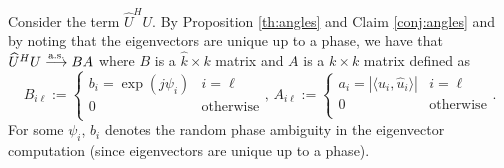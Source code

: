 Consider the term $\widehat{U}^HU$. By Proposition \ref{th:angles} and Claim \ref{conj:angles} and by noting that the eigenvectors are unique up to a phase, we have that $\widehat{U}^HU \overset{\textrm{a.s.}}{\longrightarrow} BA$ where $B$ is a $\widehat{k}\times k$ matrix and $A$ is a $k \times k$ matrix defined as
\small\begin{equation*}
B_{i\ell}:=\begin{cases} b_i=\exp(j\psi_i) & i=\ell \\ 0 & \text{otherwise} \\ \end{cases},\,A_{i\ell}:=\begin{cases} a_i=|\langle u_i,\widehat{u}_i\rangle| & i=\ell \\ 0 & \text{otherwise} \\ \end{cases}.
\end{equation*}\normalsize
For some $\psi_{i}$, $b_i$ denotes the random phase ambiguity in the eigenvector computation (since eigenvectors are unique up to a phase).

